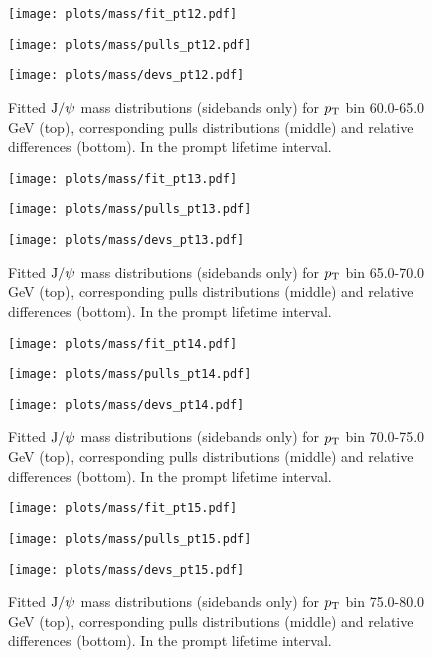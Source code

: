 \pagebreak

\begin{figure}[h!]
\centering
\texttt{[image: plots/mass/fit\_pt12.pdf]}

\texttt{[image: plots/mass/pulls\_pt12.pdf]}

\texttt{[image: plots/mass/devs\_pt12.pdf]}

\caption{Fitted $\text{J/}\psi$ mass distributions (sidebands only) for $p_\text{T}$ bin 60.0-65.0 GeV (top), corresponding pulls distributions (middle) and relative differences (bottom). In the prompt lifetime interval.}\label{f:m_fit_12}
\end{figure}

\pagebreak

\begin{figure}[h!]
\centering
\texttt{[image: plots/mass/fit\_pt13.pdf]}

\texttt{[image: plots/mass/pulls\_pt13.pdf]}

\texttt{[image: plots/mass/devs\_pt13.pdf]}

\caption{Fitted $\text{J/}\psi$ mass distributions (sidebands only) for $p_\text{T}$ bin 65.0-70.0 GeV (top), corresponding pulls distributions (middle) and relative differences (bottom). In the prompt lifetime interval.}\label{f:m_fit_13}
\end{figure}

\pagebreak

\begin{figure}[h!]
\centering
\texttt{[image: plots/mass/fit\_pt14.pdf]}

\texttt{[image: plots/mass/pulls\_pt14.pdf]}

\texttt{[image: plots/mass/devs\_pt14.pdf]}

\caption{Fitted $\text{J/}\psi$ mass distributions (sidebands only) for $p_\text{T}$ bin 70.0-75.0 GeV (top), corresponding pulls distributions (middle) and relative differences (bottom). In the prompt lifetime interval.}\label{f:m_fit_14}
\end{figure}

\pagebreak

\begin{figure}[h!]
\centering
\texttt{[image: plots/mass/fit\_pt15.pdf]}

\texttt{[image: plots/mass/pulls\_pt15.pdf]}

\texttt{[image: plots/mass/devs\_pt15.pdf]}

\caption{Fitted $\text{J/}\psi$ mass distributions (sidebands only) for $p_\text{T}$ bin 75.0-80.0 GeV (top), corresponding pulls distributions (middle) and relative differences (bottom). In the prompt lifetime interval.}\label{f:m_fit_15}
\end{figure}

